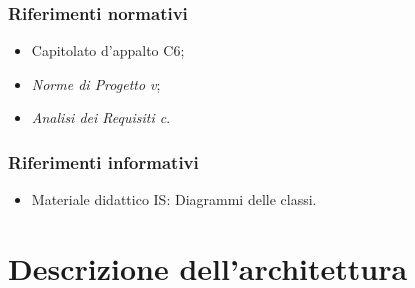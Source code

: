 \subsubsection{Riferimenti normativi}
\begin{itemize}
\item Capitolato d'appalto C6;
\item \textit{Norme di Progetto v};
\item \textit{Analisi dei Requisiti c}.
\end{itemize}

\subsubsection{Riferimenti informativi}
\begin{itemize}
\item Materiale didattico IS: Diagrammi delle classi.
\end{itemize} 

\section{Descrizione dell'architettura}
